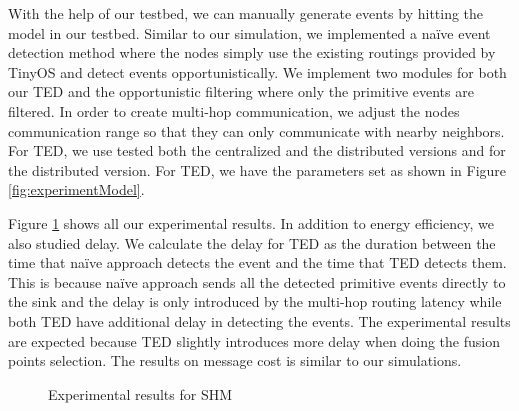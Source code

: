 With the help of our testbed, we can manually generate events by hitting the model in our testbed. Similar to our simulation, we implemented a na\"{i}ve event detection method where the nodes simply use the existing routings provided by TinyOS \cite{nesc} and detect events opportunistically. We implement two modules for both our TED and the opportunistic filtering where only the primitive events are filtered. In order to create multi-hop communication, we adjust the nodes communication range so that they can only communicate with nearby neighbors. For TED, we use tested both the centralized and the distributed versions and for the distributed version. For TED, we have the parameters set as shown in Figure \ref{fig:experimentModel}.

Figure \ref{fig:exp-all} shows all our experimental results. In addition to energy efficiency, we also studied delay. We calculate the delay for TED as the duration between the time that na\"{i}ve approach detects the event and the time that TED detects them. This is because na\"{i}ve approach sends all the detected primitive events directly to the sink and the delay is only introduced by the multi-hop routing latency while both TED have additional delay in detecting the events. The experimental results are expected because TED slightly introduces more delay when doing the fusion points selection. The results on message cost is similar to our simulations.

\begin{figure}
\centering
{}
\caption{Experimental results for SHM}
\label{fig:exp-all}
\end{figure}
